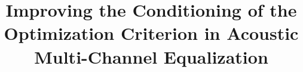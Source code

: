 \documentclass[twocolumn]{bmcart}%
\begin{document}
\newlength\figureheight
\newlength\figurewidth
\setlength\figureheight{3cm}
\setlength{}

\begin{frontmatter}

\begin{fmbox}

\title{Improving the Conditioning of the Optimization Criterion in Acoustic Multi-Channel Equalization}


\author[
   addressref={aff1},                   %
   corref={aff1},                       %
   email={ina.kodrasi@uni-oldenburg.de}   %
]{ }
\author[
   addressref={aff1},
   email={simon.doclo@uni-oldenburg.de}
]{ }

\address[id=aff1]{%
  , %
  ,                     %
  ,                              %
}



\begin{abstractbox}


\end{abstractbox}
\end{fmbox}
\end{frontmatter}
\end{document}
